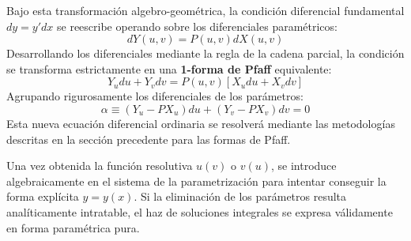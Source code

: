 \documentclass[11pt,a4paper]{article}
\theoremstyle{definition}
\theoremstyle{plain}
\begin{document}
Bajo esta transformación algebro-geométrica, la condición diferencial fundamental $dy = y'dx$ se reescribe operando sobre los diferenciales paramétricos:
$$ dY(u,v) = P(u,v)dX(u,v) $$
Desarrollando los diferenciales mediante la regla de la cadena parcial, la condición se transforma estrictamente en una \textbf{1-forma de Pfaff} equivalente:
$$ Y_u du + Y_v dv = P(u,v)[X_u du + X_v dv] $$
Agrupando rigurosamente los diferenciales de los parámetros:
$$
    \alpha \equiv (Y_u - P X_u)du + (Y_v - P X_v)dv = 0
$$
Esta nueva ecuación diferencial ordinaria se resolverá mediante las metodologías descritas en la sección precedente para las formas de Pfaff. 

Una vez obtenida la función resolutiva $u(v)$ o $v(u)$, se introduce algebraicamente en el sistema de la parametrización para intentar conseguir la forma explícita $y = y(x)$. Si la eliminación de los parámetros resulta analíticamente intratable, el haz de soluciones integrales se expresa válidamente en forma paramétrica pura.
\end{document}

